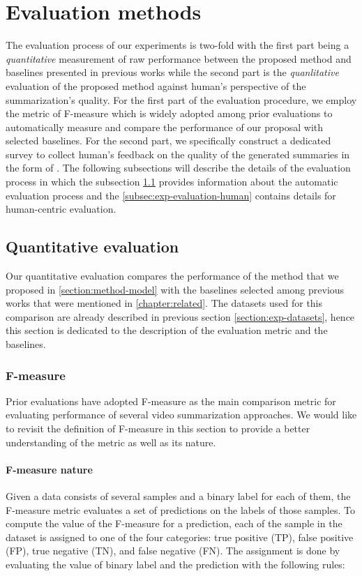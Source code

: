 \section{Evaluation methods}
\label{section:exp-evaluation}

The evaluation process of our experiments is two-fold with the first part being a \textit{quantitative} measurement of raw performance between the proposed method and baselines presented in previous works while the second part is the \textit{quanlitative} evaluation of the proposed method against human's perspective of the summarization's quality. For the first part of the evaluation procedure, we employ the metric of F-measure which is widely adopted among prior evaluations to automatically measure and compare the performance of our proposal with selected baselines. For the second part, we specifically construct a dedicated survey to collect human's feedback on the quality of the generated summaries in the form of . The following subsections will describe the details of the evaluation process in which the subsection \ref{subsec:exp-evaluation-quantitative} provides information about the automatic evaluation process and the \ref{subsec:exp-evaluation-human} contains details for human-centric evaluation.

\subsection{Quantitative evaluation}
\label{subsec:exp-evaluation-quantitative}
    Our quantitative evaluation compares the performance of the method that we proposed in \ref{section:method-model} with the baselines selected among previous works that were mentioned in \ref{chapter:related}. The datasets used for this comparison are already described in previous section \ref{section:exp-datasets}, hence this section is dedicated to the description of the evaluation metric and the baselines.

    \subsubsection{F-measure}
    \label{subsubsec:exp-evaluation-quantitative-fmeasure}
        Prior evaluations have adopted F-measure as the main comparison metric for evaluating performance of several video summarization approaches. We would like to revisit the definition of F-measure in this section to provide a better understanding of the metric as well as its nature.

        \paragraph[long]{F-measure nature}
            Given a data consists of several samples and a binary label for each of them, the F-measure metric evaluates a set of predictions on the labels of those samples. To compute the value of the F-measure for a prediction, each of the sample in the dataset is assigned to one of the four categories: true positive (TP), false positive (FP), true negative (TN), and false negative (FN). The assignment is done by evaluating the value of binary label and the prediction with the following rules:
            
